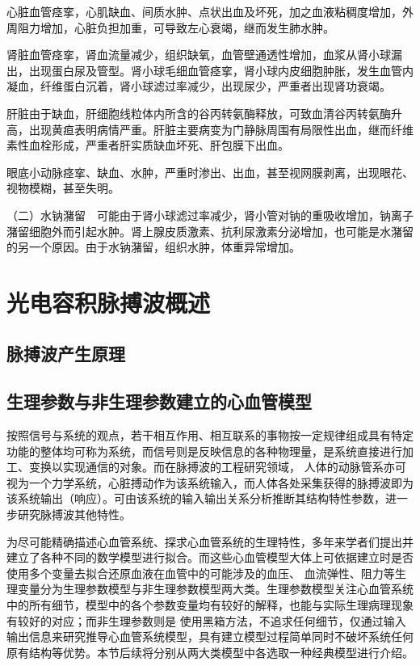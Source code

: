 心脏血管痉挛，心肌缺血、间质水肿、点状出血及坏死，加之血液粘稠度增加，外周阻力增加，心脏负担加重，可导致左心衰竭，继而发生肺水肿。

肾脏血管痉挛，肾血流量减少，组织缺氧，血管壁通透性增加，血浆从肾小球漏出，出现蛋白尿及管型。肾小球毛细血管痉挛，肾小球内皮细胞肿胀，发生血管内凝血，纤维蛋白沉着，肾小球滤过率减少，出现尿少，严重者出现肾功衰竭。

肝脏由于缺血，肝细胞线粒体内所含的谷丙转氨酶释放，可致血清谷丙转氨酶升高，出现黄疸表明病情严重。肝脏主要病变为门静脉周围有局限性出血，继而纤维素性血栓形成，严重者肝实质缺血坏死、肝包膜下出血。

眼底小动脉痉挛、缺血、水肿，严重时渗出、出血，甚至视网膜剥离，出现眼花、视物模糊，甚至失明。

（二）水钠潴留　可能由于肾小球滤过率减少，肾小管对钠的重吸收增加，钠离子潴留细胞外而引起水肿。肾上腺皮质激素、抗利尿激素分泌增加，也可能是水潴留的另一个原因。由于水钠潴留，组织水肿，体重异常增加。
\section{光电容积脉搏波概述}
\subsection{脉搏波产生原理}
\subsection{生理参数与非生理参数建立的心血管模型}
按照信号与系统的观点，若干相互作用、相互联系的事物按一定规律组成具有特定功能的整体均可称为系统，而信号则是反映信息的各种物理量，是系统直接进行加工、变换以实现通信的对象。而在脉搏波的工程研究领域，
人体的动脉管系亦可视为一个力学系统，心脏搏动作为该系统输入，而人体各处采集获得的脉搏波即为该系统输出（响应）。可由该系统的输入输出关系分析推断其结构特性参数，进一步研究脉搏波其他特性。\cite{PPGYY}

为尽可能精确描述心血管系统、探求心血管系统的生理特性，多年来学者们提出并建立了各种不同的数学模型进行拟合。而这些心血管模型大体上可依据建立时是否使用多个变量去拟合还原血液在血管中的可能涉及的血压、
血流弹性、阻力等生理变量分为生理参数模型与非生理参数模型两大类\cite{PPGYY}。生理参数模型关注心血管系统中的所有细节，模型中的各个参数变量均有较好的解释，也能与实际生理病理现象有较好的对应；而非生理参数则是
使用黑箱方法，不追求任何细节，仅通过输入输出信息来研究推导心血管系统模型，具有建立模型过程简单同时不破坏系统任何原有结构等优势。本节后续将分别从两大类模型中各选取一种经典模型进行介绍。
